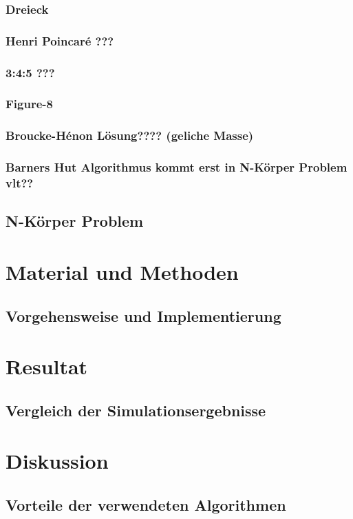 \documentclass[a4paper,12pt,twoside]{article}
\begin{document}
\subsubsection{Dreieck}
\subsubsection{Henri Poincaré ???}
\subsubsection{3:4:5 ???}
\subsubsection{Figure-8}
\subsubsection{Broucke-Hénon Lösung???? (geliche Masse)}
\subsubsection{Barners Hut Algorithmus kommt erst in N-Körper Problem vlt??}




\subsection{N-Körper Problem}

\section{Material und Methoden}
\subsection{Vorgehensweise und Implementierung}

\section{Resultat}
\subsection{Vergleich der Simulationsergebnisse}

\section{Diskussion}
\subsection{Vorteile der verwendeten Algorithmen}
\end{document}
